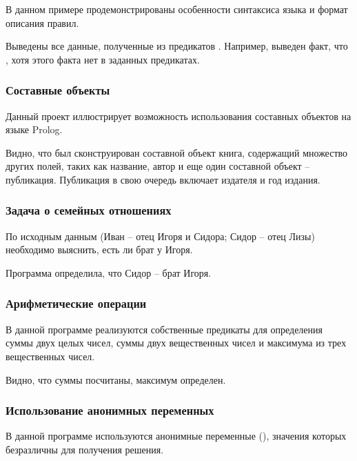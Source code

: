 В данном примере продемонстрированы особенности синтаксиса языка и формат описания правил. 


Выведены все данные, полученные из предикатов . Например, выведен факт, что , хотя этого факта нет в заданных предикатах.

\subsubsection{Составные объекты}

Данный проект иллюстрирует возможность использования составных объектов на языке Prolog.


Видно, что был сконструирован составной объект книга, содержащий множество других полей, таких как название, автор и еще один составной объект -- публикация. Публикация в свою очередь включает издателя и год издания.

\subsubsection{Задача о семейных отношениях}

По исходным данным (Иван -- отец Игоря и Сидора; Сидор -- отец Лизы) необходимо выяснить,  есть ли брат у Игоря.


Программа определила, что Сидор -- брат Игоря.

\subsubsection{Арифметические операции}

В данной программе реализуются собственные предикаты для определения суммы двух целых чисел, суммы двух вещественных чисел и максимума из трех вещественных чисел. 


Видно, что суммы посчитаны, максимум определен.

\subsubsection{Использование анонимных переменных}

В данной программе используются анонимные переменные (\code{_}), значения которых безразличны для получения решения.

